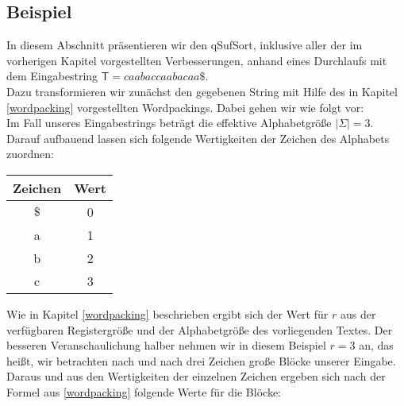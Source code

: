 \usetikzlibrary{decorations.pathreplacing,calc}

\newcommand{\tikzmark}[2][-3pt]{\tikz[remember picture, overlay, baseline=-0.5ex]\node[#1](#2){};}

\setcounter{arrow}{0}
\newcommand{\drawcurvedarrow}[3][]{%
 \refstepcounter{arrow}
 \tikz[remember picture, overlay]\draw (#2.center)edge[#1]node[coordinate,pos=0.5, name=arrow-\thearrow]{}(#3.center);
}

\newcommand{\annote}[3][]{%
 \tikz[remember picture, overlay]\node[#1] at (#2) {#3};
}

\subsection{Beispiel}
In diesem Abschnitt präsentieren wir den qSufSort, inklusive aller der im vorherigen Kapitel vorgestellten Verbesserungen, anhand eines Durchlaufs mit dem Eingabestring $\mathsf{T} = caabaccaabacaa\$$.\\
Dazu transformieren wir zunächst den gegebenen String mit Hilfe des in Kapitel \ref{wordpacking} vorgestellten Wordpackings. Dabei gehen wir wie folgt vor: \\
Im Fall unseres Eingabestrings beträgt die effektive Alphabetgröße $|\Sigma| = 3$. Darauf aufbauend lassen sich folgende Wertigkeiten der Zeichen des Alphabets zuordnen:\\
\begin{center}

\begin{tabular}{c | c}
Zeichen & Wert \\
\hline
$\$$ & 0 \\
a & 1 \\
b & 2 \\
c & 3 
\end{tabular}
\end{center}

Wie in Kapitel \ref{wordpacking} beschrieben ergibt sich der Wert für $r$ aus der verfügbaren Registergröße und der Alphabetgröße des vorliegenden Textes. Der besseren Veranschaulichung halber nehmen wir in diesem Beispiel $r=3$ an, das heißt, wir betrachten nach und nach drei Zeichen große Blöcke unserer Eingabe. Daraus und aus den Wertigkeiten der einzelnen Zeichen ergeben sich nach der Formel aus \ref{wordpacking} folgende Werte für die Blöcke: \\

